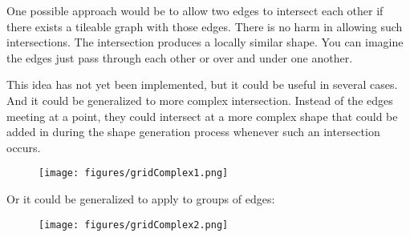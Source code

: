 \documentclass[acmtog]{acmart}
\begin{document}
One possible approach would be to allow two edges to intersect each other if
there exists a tileable graph with those edges. There is no harm in allowing such
intersections. The intersection produces a locally similar shape. You can
imagine the edges just pass through each other or over and under one another.

This idea has not yet been implemented, but it could be useful in several 
cases. And it could be generalized to more complex intersection. Instead of 
the edges meeting at a point, they could intersect at a more complex shape 
that could be added in during the shape generation process whenever such an 
intersection occurs.

\begin{figure}[H]
\centering
\texttt{[image: figures/gridComplex1.png]}
\end{figure}

Or it could be generalized to apply to groups of edges:

\begin{figure}[H]
\centering
\texttt{[image: figures/gridComplex2.png]}
\end{figure}



\end{document}
